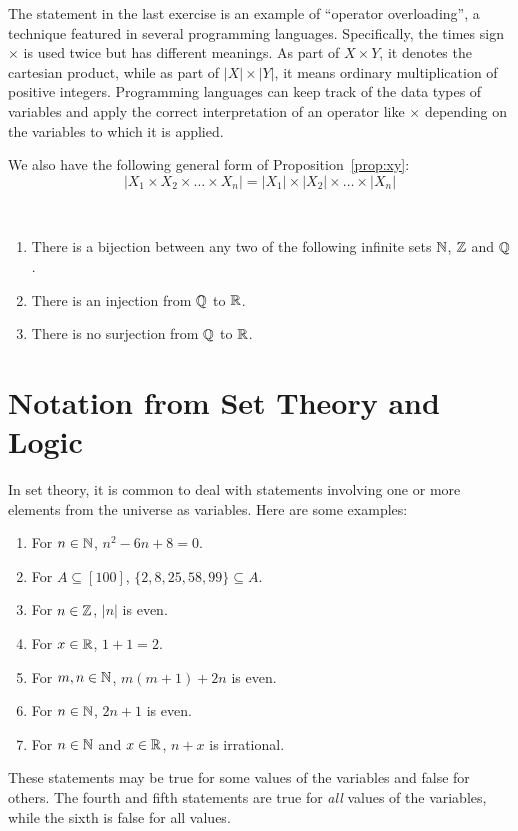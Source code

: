 \begin{remark}
The statement in the last exercise is an example of ``operator
overloading'', a technique featured in several programming
languages.  Specifically, the times sign $\times$ is used
twice but has different meanings.  As part of $X\times Y$, it
denotes the cartesian product, while as part of $|X|\times |Y|$,
it means ordinary multiplication of positive integers.  Programming
languages can keep track of the data types of variables and
apply the correct interpretation of an operator like $\times$
depending on the variables to which it is applied.
\end{remark}

We also have the following general form of Proposition~\ref{prop:xy}:
\[
|X_1\times X_2\times\dots\times X_n|=
|X_1|\times |X_2|\times\dots\times |X_n|
\]

\begin{theorem}\hfill\mbox{}\\
\begin{enumerate}
\item There is a bijection between any two of the following
infinite sets $\mathbb{N}$, $\mathbb{Z}$ and $\mathbb{Q}$. 
\item There is an injection from $\mathbb{Q}$ to $\mathbb{R}$.
\item There is no surjection from $\mathbb{Q}$ to $\mathbb{R}$.
\end{enumerate}
\end{theorem}

\section{Notation from Set Theory and Logic}

In set theory, it is common to deal with statements 
involving one or more elements from the universe as
variables.  Here are some examples:
\begin{enumerate}
\item For $n\in\mathbb{N}$, $n^2-6n+8=0$.
\item For $A\subseteq[100]$, $\{2,8,25,58,99\}\subseteq A$.
\item For $n\in \mathbb{Z}$, $|n|$ is even.
\item For $x\in \mathbb{R}$, $1+1=2$.
\item For $m,n\in \mathbb{N}$, $m(m+1)+2n$ is even.
\item For $n\in \mathbb{N}$, $2n+1$ is even.
\item For $n\in \mathbb{N}$ and $x\in\mathbb{R}$, $n+x$ is
irrational.
\end{enumerate}
These statements may be true for some values of the variables
and false for others.  The fourth and fifth statements
are true for \textit{all} values of the variables, while
the sixth is false for all values.


